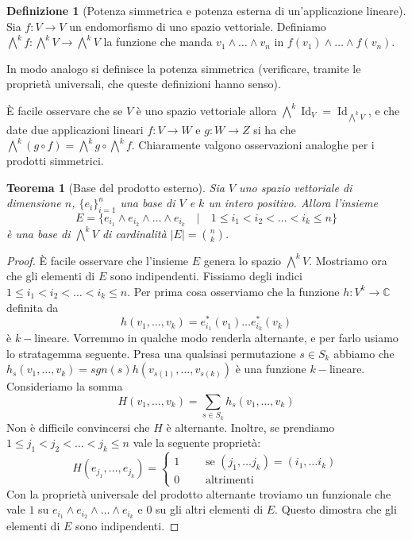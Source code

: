 \documentclass[11pt]{article}
\theoremstyle{plain}
\newtheorem{thm}{Teorema}[section]
\theoremstyle{definition}
\newtheorem{defn}{Definizione}[section]
\theoremstyle{remark}
\newcommand{\C}{\mathbb{C}}
\DeclareMathOperator{\Id}{Id}
\begin{document}
\begin{defn}[Potenza simmetrica e potenza esterna di un'applicazione lineare]
Sia $f: V\to V$ un endomorfismo di uno spazio vettoriale. Definiamo
$\bigwedge^k f : \bigwedge^k V \to \bigwedge^k V$ la funzione che manda $v_1 \wedge \ldots \wedge v_n$ in $f(v_1) \wedge \ldots \wedge f(v_n)$.

In modo analogo si definisce la potenza simmetrica (verificare, tramite le proprietà universali, che queste definizioni hanno senso).
\end{defn}


\`E facile osservare che se $V$ è uno spazio vettoriale allora $\bigwedge^k \Id_V = \Id_{\bigwedge^kV}$,
e che date due applicazioni lineari $f:V\to W$ e $g:W\to Z$ si ha che $\bigwedge^k(g\circ f) = \bigwedge^kg\circ\bigwedge^kf$.
Chiaramente valgono osservazioni analoghe per i prodotti simmetrici.

\begin{thm}[Base del prodotto esterno]
Sia $V$ uno spazio vettoriale di dimensione $n$, $\{e_i\}_{i=1}^n$ una base di $V$ e $k$ un intero positivo.
Allora l'insieme
\[E=\{e_{i_1} \wedge e_{i_2}\wedge \ldots \wedge e_{i_k} \quad|\quad 1 \leq i_1 < i_2 <\ldots< i_k \leq n\}\]
è una base di $\bigwedge^k V$ di cardinalità $|E|= \binom {n}{k}$.
\label{thm:prodotto esterno}
\end{thm}
\begin{proof}
\`E facile osservare che l'insieme $E$ genera lo spazio $\bigwedge^k V$. Mostriamo ora che gli elementi di $E$ sono indipendenti.
Fissiamo degli indici $1 \leq i_1 < i_2 <\ldots< i_k \leq n$.
Per prima cosa osserviamo che la funzione $h:V^k\to\C$ definita da
\[ h(v_1,\dots,v_k) = e_{i_1}^*(v_1)\dots e_{i_k}^*(v_k) \] 
è $k-$lineare. Vorremmo in qualche modo renderla alternante, e per farlo usiamo lo stratagemma seguente.
Presa una qualsiasi permutazione $s\in S_k$
abbiamo che $h_s(v_1,\dots,v_k) = sgn(s)h(v_{s(1)}, \dots, v_{s(k)})$ è una funzione $k-$lineare. Consideriamo la somma
\[ H(v_1,\dots, v_k) = \sum_{s\in S_k} h_s(v_1,\dots,v_k) \]
Non è difficile convincersi che $H$ è alternante. Inoltre, se prendiamo $1 \leq j_1 < j_2 <\ldots< j_k \leq n$ vale la seguente proprietà:
\[H(e_{j_1}, \dots, e_{j_k}) = \begin{cases}
1 \qquad\text{ se } (j_1,\dots j_k) = (i_1, \dots i_k)\\
0 \qquad\text{ altrimenti}
\end{cases}\]
Con la proprietà universale del prodotto alternante troviamo un funzionale che vale $1$ su $e_{i_1} \wedge e_{i_2}\wedge \ldots \wedge e_{i_k}$
e $0$ su gli altri elementi di $E$. Questo dimostra che gli elementi di $E$ sono indipendenti.
\end{proof}
\end{document}
